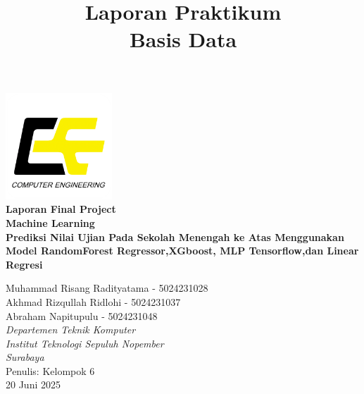 \documentclass[a4paper,12pt]{report}
\title{Laporan Praktikum\\
Basis Data}
\author{}
\date{}
\begin{document}
\begin{titlepage}
    \centering

    \includegraphics[width=0.3\textwidth]{images/logo-tekkom.png}\\[1cm]

    {\Huge \textbf{Laporan Final Project}\\[0.3cm]}
    {\Huge \textbf{Machine Learning}}\\[1cm]
    
    {\Large \textbf{Prediksi Nilai Ujian Pada Sekolah Menengah ke Atas Menggunakan Model RandomForest Regressor,XGboost,
    MLP Tensorflow,dan Linear Regresi} \\[1cm]}

    {\Large {Muhammad Risang Radityatama - 5024231028}}\\[0.3cm]
    {\Large {Akhmad Rizqullah Ridlohi - 5024231037}}\\[0.3cm]
    {\Large {Abraham Napitupulu - 5024231048}}\\[1cm]

    
    {\large \textit{Departemen Teknik Komputer}}\\
    {\large \textit{Institut Teknologi Sepuluh Nopember}}\\
    {\large \textit{Surabaya}}\\[0.3cm]

    \hfill Penulis: Kelompok 6\\
    \hfill 20 Juni 2025
\end{titlepage}

\tableofcontents
\clearpage












\end{document}
